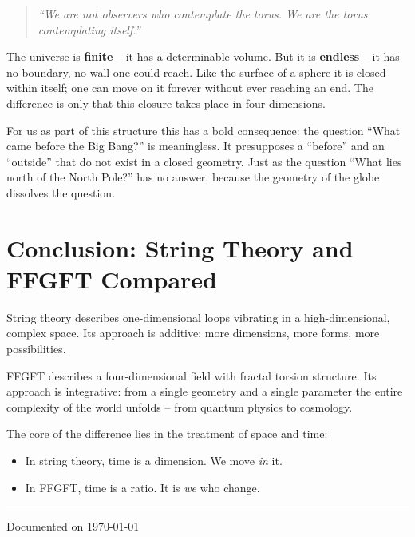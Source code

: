 	\begin{quote}
		\textit{``We are not observers who contemplate the torus. We are the torus contemplating itself.''}
	\end{quote}
	
	The universe is \textbf{finite} -- it has a determinable volume. But it is \textbf{endless} -- it has no boundary, no wall one could reach. Like the surface of a sphere it is closed within itself; one can move on it forever without ever reaching an end. The difference is only that this closure takes place in four dimensions.
	
	For us as part of this structure this has a bold consequence: the question ``What came before the Big Bang?'' is meaningless. It presupposes a ``before'' and an ``outside'' that do not exist in a closed geometry. Just as the question ``What lies north of the North Pole?'' has no answer, because the geometry of the globe dissolves the question.
	
	\section*{Conclusion: String Theory and FFGFT Compared}
	
	String theory describes one-dimensional loops vibrating in a high-dimensional, complex space. Its approach is additive: more dimensions, more forms, more possibilities.
	
	FFGFT describes a four-dimensional field with fractal torsion structure. Its approach is integrative: from a single geometry and a single parameter the entire complexity of the world unfolds -- from quantum physics to cosmology.
	
	The core of the difference lies in the treatment of space and time:
	\begin{itemize}
		\item In string theory, time is a dimension. We move \textit{in} it.
		\item In FFGFT, time is a ratio. It is \textit{we} who change.
	\end{itemize}
	
	\vspace{1cm}
	\begin{center}
		\rule{5cm}{0.4pt}
		
		\small{Documented on \today}
	\end{center}
